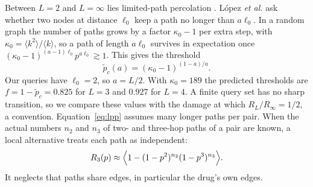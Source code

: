 Between $L=2$ and $L=\infty$ lies limited-path percolation
\cite{lopez2007limited}. López \textit{et al.} ask whether two nodes at distance
$\ell_0$ keep a path no longer than $a\ell_0$. In a random graph the number of
paths grows by a factor $\kappa_0-1$ per extra step, with
$\kappa_0=\langle k^2\rangle/\langle k\rangle$, so a path of length $a\ell_0$
survives in expectation once $(\kappa_0-1)^{(a-1)\ell_0}p^{a\ell_0}\gtrsim1$. This
gives the threshold
\begin{equation}
\tilde p_c(a)=(\kappa_0-1)^{(1-a)/a}.
\label{eq:lpp}
\end{equation}
Our queries have $\ell_0=2$, so $a=L/2$. With $\kappa_0=189$ the predicted
thresholds are $f=1-\tilde p_c=0.825$ for $L=3$ and $0.927$ for $L=4$. A
finite query set has no sharp transition, so we compare these values with the
damage at which $R_L/R_\infty=1/2$, a convention. Equation~\eqref{eq:lpp}
assumes many longer paths per pair. When the actual numbers $n_2$ and $n_3$ of
two- and three-hop paths of a pair are known, a local alternative treats each
path as independent:
\begin{equation}
R_3(p)\approx\Bigl\langle1-(1-p^2)^{n_2}(1-p^3)^{n_3}\Bigr\rangle.
\label{eq:paths}
\end{equation}
It neglects that paths share edges, in particular the drug's own edges.
